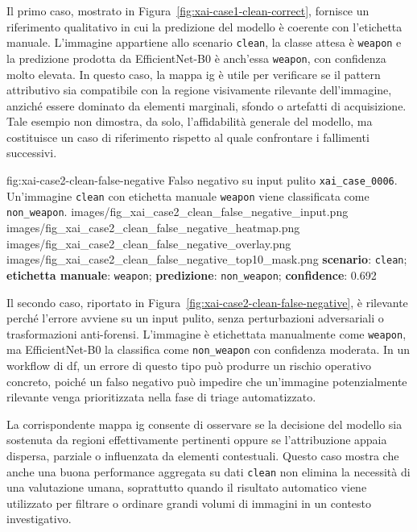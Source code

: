 Il primo caso, mostrato in Figura~\ref{fig:xai-case1-clean-correct}, fornisce
un riferimento qualitativo in cui la predizione del modello è coerente con
l'etichetta manuale. L'immagine appartiene allo scenario \texttt{clean}, la
classe attesa è \texttt{weapon} e la predizione prodotta da EfficientNet-B0 è
anch'essa \texttt{weapon}, con confidenza molto elevata. In questo caso, la
mappa \gls{ig} è utile per verificare se il pattern attributivo sia compatibile
con la regione visivamente rilevante dell'immagine, anziché essere dominato da
elementi marginali, sfondo o artefatti di acquisizione. Tale esempio non dimostra,
da solo, l'affidabilità generale del modello, ma costituisce un caso di
riferimento rispetto al quale confrontare i fallimenti successivi.

\XAIcaseFigureMaskGrid
{fig:xai-case2-clean-false-negative}
{Falso negativo su input pulito \texttt{xai\_case\_0006}. Un'immagine
\texttt{clean} con etichetta manuale \texttt{weapon} viene classificata come
\texttt{non\_weapon}.}
{images/fig_xai_case2_clean_false_negative_input.png}
{images/fig_xai_case2_clean_false_negative_heatmap.png}
{images/fig_xai_case2_clean_false_negative_overlay.png}
{images/fig_xai_case2_clean_false_negative_top10_mask.png}
{\textbf{scenario}: \texttt{clean};
 \textbf{etichetta manuale}: \texttt{weapon};
 \textbf{predizione}: \texttt{non\_weapon};
 \textbf{confidence}: 0.692}

Il secondo caso, riportato in Figura~\ref{fig:xai-case2-clean-false-negative},
è rilevante perché l'errore avviene su un input pulito, senza perturbazioni
adversariali o trasformazioni anti-forensi. L'immagine è etichettata manualmente
come \texttt{weapon}, ma EfficientNet-B0 la classifica come \texttt{non\_weapon}
con confidenza moderata. In un workflow di \gls{df}, un errore di questo tipo
può produrre un rischio operativo concreto, poiché un falso negativo può impedire
che un'immagine potenzialmente rilevante venga prioritizzata nella fase di triage
automatizzato.

La corrispondente mappa \gls{ig} consente di osservare se la decisione del
modello sia sostenuta da regioni effettivamente pertinenti oppure se
l'attribuzione appaia dispersa, parziale o influenzata da elementi contestuali.
Questo caso mostra che anche una buona performance aggregata su dati
\texttt{clean} non elimina la necessità di una valutazione umana, soprattutto
quando il risultato automatico viene utilizzato per filtrare o ordinare grandi
volumi di immagini in un contesto investigativo.

